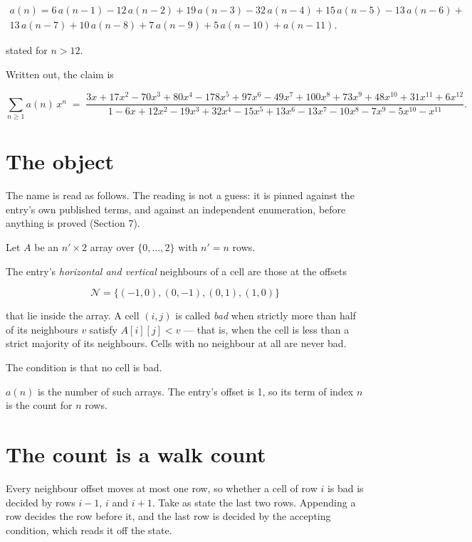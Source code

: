 \documentclass[11pt]{article}
\theoremstyle{definition}
\begin{document}
\begin{multline*} a(n) = 6\,a(n-1) - 12\,a(n-2) + 19\,a(n-3) - 32\,a(n-4) + 15\,a(n-5) - 13\,a(n-6) + \\ 13\,a(n-7) + 10\,a(n-8) + 7\,a(n-9) + 5\,a(n-10) + a(n-11). \end{multline*}

stated for $n > 12$.

Written out, the claim is

\[\sum_{n \ge 1} a(n)\,x^n \;=\; \frac{3x + 17x^{2} - 70x^{3} + 80x^{4} - 178x^{5} + 97x^{6} - 49x^{7} + 100x^{8} + 73x^{9} + 48x^{10} + 31x^{11} + 6x^{12}}{1 - 6x + 12x^{2} - 19x^{3} + 32x^{4} - 15x^{5} + 13x^{6} - 13x^{7} - 10x^{8} - 7x^{9} - 5x^{10} - x^{11}}.\]

\section{The object}

The name is read as follows. The reading is not a guess: it is pinned against the entry's own published terms, and against an independent enumeration, before anything is proved (Section 7).

Let $A$ be an $n' \times 2$ array over $\{0,\dots,2\}$ with $n' = n$ rows.

The entry's {\itshape horizontal and vertical} neighbours of a cell are those at the offsets

\[\mathcal{N} = \{(-1,0), (0,-1), (0,1), (1,0)\}\]

that lie inside the array. A cell $(i,j)$ is called {\itshape bad} when strictly more than half of its neighbours $v$ satisfy $A[i][j] < v$ --- that is, when the cell is less than a strict majority of its neighbours. Cells with no neighbour at all are never bad.

The condition is that no cell is bad.

$a(n)$ is the number of such arrays. The entry's offset is 1, so its term of index $n$ is the count for $n$ rows.

\section{The count is a walk count}

Every neighbour offset moves at most one row, so whether a cell of row $i$ is bad is decided by rows $i-1$, $i$ and $i+1$. Take as state the last two rows. Appending a row decides the row before it, and the last row is decided by the accepting condition, which reads it off the state.
\end{document}
